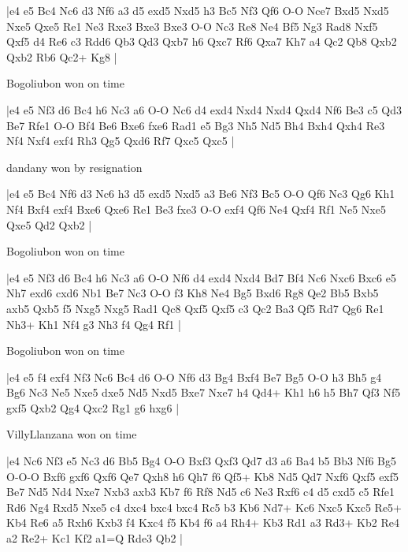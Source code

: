 \makegametitle
|e4 e5 Bc4 Nc6 d3 Nf6 a3 d5 exd5 Nxd5 h3 Bc5 Nf3 Qf6 O-O Nce7 Bxd5 Nxd5 Nxe5 Qxe5 Re1 Ne3 Rxe3 Bxe3 Bxe3 O-O Nc3 Re8 Ne4 Bf5 Ng3 Rad8 Nxf5 Qxf5 d4 Re6 c3 Rdd6 Qb3 Qd3 Qxb7 h6 Qxc7 Rf6 Qxa7 Kh7 a4 Qc2 Qb8 Qxb2 Qxb2 Rb6 Qc2+ Kg8  |

\showboard

Bogoliubon won on time

\makegametitle
|e4 e5 Nf3 d6 Bc4 h6 Nc3 a6 O-O Nc6 d4 exd4 Nxd4 Nxd4 Qxd4 Nf6 Be3 c5 Qd3 Be7 Rfe1 O-O Bf4 Be6 Bxe6 fxe6 Rad1 e5 Bg3 Nh5 Nd5 Bh4 Bxh4 Qxh4 Re3 Nf4 Nxf4 exf4 Rh3 Qg5 Qxd6 Rf7 Qxc5 Qxc5  |

\showboard

dandany won by resignation

\makegametitle
|e4 e5 Bc4 Nf6 d3 Nc6 h3 d5 exd5 Nxd5 a3 Be6 Nf3 Bc5 O-O Qf6 Nc3 Qg6 Kh1 Nf4 Bxf4 exf4 Bxe6 Qxe6 Re1 Be3 fxe3 O-O exf4 Qf6 Ne4 Qxf4 Rf1 Ne5 Nxe5 Qxe5 Qd2 Qxb2  |

\showboard

Bogoliubon won on time

\makegametitle
|e4 e5 Nf3 d6 Bc4 h6 Nc3 a6 O-O Nf6 d4 exd4 Nxd4 Bd7 Bf4 Nc6 Nxc6 Bxc6 e5 Nh7 exd6 cxd6 Nb1 Be7 Nc3 O-O f3 Kh8 Ne4 Bg5 Bxd6 Rg8 Qe2 Bb5 Bxb5 axb5 Qxb5 f5 Nxg5 Nxg5 Rad1 Qc8 Qxf5 Qxf5 c3 Qc2 Ba3 Qf5 Rd7 Qg6 Re1 Nh3+ Kh1 Nf4 g3 Nh3 f4 Qg4 Rf1  |

\showboard

Bogoliubon won on time

\makegametitle
|e4 e5 f4 exf4 Nf3 Nc6 Bc4 d6 O-O Nf6 d3 Bg4 Bxf4 Be7 Bg5 O-O h3 Bh5 g4 Bg6 Nc3 Ne5 Nxe5 dxe5 Nd5 Nxd5 Bxe7 Nxe7 h4 Qd4+ Kh1 h6 h5 Bh7 Qf3 Nf5 gxf5 Qxb2 Qg4 Qxc2 Rg1 g6 hxg6  |

\showboard

VillyLlanzana won on time

\makegametitle
|e4 Nc6 Nf3 e5 Nc3 d6 Bb5 Bg4 O-O Bxf3 Qxf3 Qd7 d3 a6 Ba4 b5 Bb3 Nf6 Bg5 O-O-O Bxf6 gxf6 Qxf6 Qe7 Qxh8 h6 Qh7 f6 Qf5+ Kb8 Nd5 Qd7 Nxf6 Qxf5 exf5 Be7 Nd5 Nd4 Nxe7 Nxb3 axb3 Kb7 f6 Rf8 Nd5 c6 Ne3 Rxf6 c4 d5 cxd5 c5 Rfe1 Rd6 Ng4 Rxd5 Nxe5 c4 dxc4 bxc4 bxc4 Rc5 b3 Kb6 Nd7+ Kc6 Nxc5 Kxc5 Re5+ Kb4 Re6 a5 Rxh6 Kxb3 f4 Kxc4 f5 Kb4 f6 a4 Rh4+ Kb3 Rd1 a3 Rd3+ Kb2 Re4 a2 Re2+ Kc1 Kf2 a1=Q Rde3 Qb2  |

